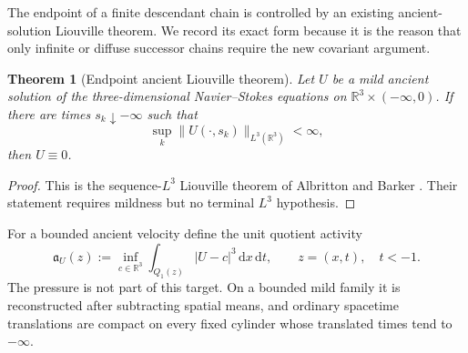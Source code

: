 \documentclass[11pt]{amsart}
\numberwithin{equation}{section}
\theoremstyle{plain}
\newtheorem{theorem}{Theorem}[section]
\theoremstyle{definition}
\theoremstyle{remark}
\newcommand{\R}{\mathbb R}
\newcommand{\dd}{\,\mathrm d}
\begin{document}
The endpoint of a finite descendant chain is controlled by an existing
ancient-solution Liouville theorem.  We record its exact form because it is the
reason that only infinite or diffuse successor chains require the new
covariant argument.

\begin{theorem}[Endpoint ancient Liouville theorem]
\label{thm:AB-endpoint}
Let \(U\) be a mild ancient solution of the three-dimensional
Navier--Stokes equations on \(\R^3\times(-\infty,0)\).  If there are times
\(s_k\downarrow-\infty\) such that
\begin{equation}\label{eq:AB-backward-L3-sequence}
 \sup_k\|U(\cdot,s_k)\|_{L^3(\R^3)}<\infty,
\end{equation}
then \(U\equiv0\).
\end{theorem}

\begin{proof}
This is the sequence-\(L^3\) Liouville theorem of Albritton and Barker
\cite[Theorem~1.2]{AlbrittonBarker2019}.  Their statement requires mildness
but no terminal \(L^3\) hypothesis.
\end{proof}

For a bounded ancient velocity define the unit quotient activity
\begin{equation}\label{eq:unit-quotient-activity}
 \mathfrak a_U(z)
 :=\inf_{c\in\R^3}\int_{Q_1(z)}|U-c|^3\dd x\dd t,
 \qquad z=(x,t),\quad t<-1.
\end{equation}
The pressure is not part of this target.  On a bounded mild family it is
reconstructed after subtracting spatial means, and ordinary spacetime
translations are compact on every fixed cylinder whose translated times tend
to \(-\infty\).
\end{document}
